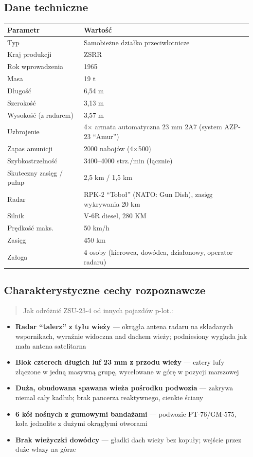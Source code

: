 \documentclass[12pt,oneside]{book}
\providecommand{\tightlist}{%
  \setlength{\itemsep}{0pt}\setlength{\parskip}{0pt}}
\begin{document}
\subsection{Dane techniczne}\label{dane-techniczne-38}

\begin{longtable}[]{@{}ll@{}}
\toprule\noalign{}
Parametr & Wartość \\
\midrule\noalign{}
\endhead
\bottomrule\noalign{}
\endlastfoot
Typ & Samobieżne działko przeciwlotnicze \\
Kraj produkcji & ZSRR \\
Rok wprowadzenia & 1965 \\
Masa & 19 t \\
Długość & 6,54 m \\
Szerokość & 3,13 m \\
Wysokość (z radarem) & 3,57 m \\
Uzbrojenie & 4× armata automatyczna 23 mm 2A7 (system AZP-23
``Amur'') \\
Zapas amunicji & 2000 nabojów (4×500) \\
Szybkostrzelność & 3400--4000 strz./min (łącznie) \\
Skuteczny zasięg / pułap & 2,5 km / 1,5 km \\
Radar & RPK-2 ``Toboł'' (NATO: Gun Dish), zasięg wykrywania 20 km \\
Silnik & V-6R diesel, 280 KM \\
Prędkość maks. & 50 km/h \\
Zasięg & 450 km \\
Załoga & 4 osoby (kierowca, dowódca, działonowy, operator radaru) \\
\end{longtable}

\subsection{Charakterystyczne cechy
rozpoznawcze}\label{charakterystyczne-cechy-rozpoznawcze-38}

\begin{quote}
Jak odróżnić ZSU-23-4 od innych pojazdów p-lot.:
\end{quote}

\begin{itemize}
\tightlist
\item
  \textbf{Radar ``talerz'' z tyłu wieży} --- okrągła antena radaru na
  składanych wspornikach, wyraźnie widoczna nad dachem wieży;
  podniesiony wygląda jak mała antena satelitarna
\item
  \textbf{Blok czterech długich luf 23 mm z przodu wieży} --- cztery
  lufy złączone w jedną masywną grupę, wycelowane w górę w pozycji
  marszowej
\item
  \textbf{Duża, obudowana spawana wieża pośrodku podwozia} --- zakrywa
  niemal cały kadłub; brak pancerza reaktywnego, cienkie ściany
\item
  \textbf{6 kół nośnych z gumowymi bandażami} --- podwozie PT-76/GM-575,
  koła jednolite z dużymi okrągłymi otworami
\item
  \textbf{Brak wieżyczki dowódcy} --- gładki dach wieży bez kopuły;
  wejście przez duże włazy na górze
\end{itemize}
\end{document}
